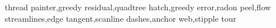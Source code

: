 thread painter,greedy residual,quadtree hatch,greedy error,radon peel,flow streamlines,edge tangent,scanline dashes,anchor web,stipple tour